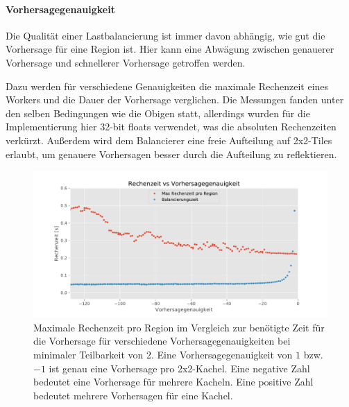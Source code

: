 \paragraph{Vorhersagegenauigkeit}

Die Qualität einer Lastbalancierung ist immer davon abhängig, wie gut die Vorhersage für eine Region ist.
Hier kann eine Abwägung zwischen genauerer Vorhersage und schnellerer Vorhersage getroffen werden.

Dazu werden für verschiedene Genauigkeiten die maximale Rechenzeit eines Workers und die Dauer der Vorhersage verglichen.
Die Messungen fanden unter den selben Bedingungen wie die Obigen statt, allerdings wurden für die Implementierung hier 32-bit floats verwendet, was die absoluten Rechenzeiten verkürzt.
Außerdem wird dem Balancierer eine freie Aufteilung auf 2x2-Tiles erlaubt, um genauere Vorhersagen besser durch die Aufteilung zu reflektieren.

\begin{figure}
	\centering
	\includegraphics[width=0.9\linewidth]{img/Evaluation/prediction_accuracy_tile2_cropped.pdf}
	\caption{Maximale Rechenzeit pro Region im Vergleich zur benötigte Zeit für die Vorhersage für verschiedene Vorhersagegenauigkeiten bei minimaler Teilbarkeit von 2.
		Eine Vorhersagegenauigkeit von $1$ bzw. $-1$ ist genau eine Vorhersage pro 2x2-Kachel. Eine negative Zahl bedeutet eine Vorhersage für mehrere Kacheln. Eine positive Zahl bedeutet mehrere Vorhersagen für eine Kachel.}
	\label{fig:balancers_prediction_accuracy}
\end{figure}

